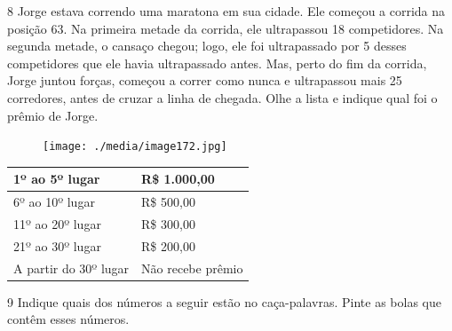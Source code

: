 
\pagebreak

\num{8} Jorge estava correndo uma maratona em sua cidade. Ele começou a corrida
na posição 63. Na primeira metade da corrida, ele ultrapassou 18
competidores. Na segunda metade, o cansaço chegou; logo, ele foi
ultrapassado por 5 desses competidores que ele havia ultrapassado antes.
Mas, perto do fim da corrida, Jorge juntou forças, começou a correr como
nunca e ultrapassou mais 25 corredores, antes de cruzar a linha de
chegada. Olhe a lista e indique qual foi o prêmio de Jorge.

\begin{figure}[htpb!]
\begin{center}
\texttt{[image: ./media/image172.jpg]}
\end{center}
\end{figure}

\vspace*{-2em}

\begin{table}[htpb!]
\begin{center}
\begin{tabular}{|l|l|}
\hline
1º ao 5º lugar        & R\$ 1.000,00      \\ \hline
6º ao 10º lugar       & R\$ 500,00        \\ \hline
11º ao 20º lugar      & R\$ 300,00        \\ \hline
21º ao 30º lugar      & R\$ 200,00        \\ \hline
A partir do 30º lugar & Não recebe prêmio \\ \hline
\end{tabular}
\end{center}
\end{table}

\vspace*{-2em}


\pagebreak
\num{9} Indique quais dos números a seguir estão no caça-palavras. Pinte
as bolas que contêm esses números.

